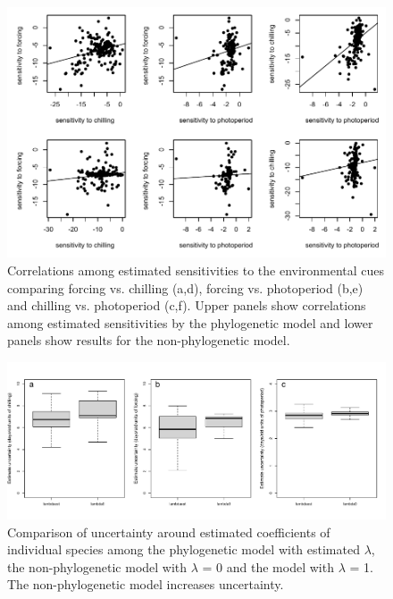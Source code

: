 \documentclass{article}\usepackage[]{graphicx}\usepackage[]{color}
\begin{document}
\begin{figure} [H]
  \begin{center}
  \includegraphics[width=16cm]{../../analyses/phylogeny/figures/FigSX_Sindromes_lamb_lamb0.pdf}
  \caption{Correlations among estimated sensitivities to the environmental cues comparing forcing vs. chilling (a,d), forcing vs. photoperiod (b,e) and chilling vs. photoperiod (c,f). Upper panels show correlations among estimated sensitivities by the phylogenetic model and lower panels show results for the non-phylogenetic model.}
  \label{fig:suppcorrelsens}
  \end{center}
\end{figure}

\begin{figure} [H]
  \begin{center}
  \includegraphics[width=16cm]{../../analyses/phylogeny/figures/FigSXXX_comparison_eachsps_uncertainty.pdf}
  \caption{Comparison of uncertainty around estimated coefficients of individual species among the phylogenetic model with estimated $\lambda$, the non-phylogenetic model with $\lambda$ = 0 and the model with $\lambda$ = 1. The non-phylogenetic model increases uncertainty.}
  \label{fig:suppuncertainties}
  \end{center}
\end{figure}
\end{document}
